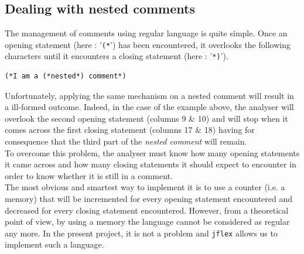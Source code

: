 \documentclass[a4paper,11pt]{article}
\begin{document}
  \subsection{Dealing with nested comments}
    The management of comments using regular language is quite simple. Once an opening statement (here : '\verb|(*|') has been encountered, it overlooks the following characters until it encounters a closing statement (here : '\verb|*)|').
    \begin{lstlisting}
(*I am a (*nested*) comment*)\end{lstlisting}
    Unfortunately, applying the same mechanism on a nested comment will result in a ill-formed outcome. Indeed, in the case of the example above, the analyser will overlook the second opening statement (columns 9 \& 10) and will stop when it comes across the first closing statement (columns 17 \& 18) having for consequence that the third part of the \textit{nested comment} will remain.\\
    To overcome this problem, the analyser must know how many opening statements it came across and how many closing statements it should expect to encounter in order to know whether it is still in a comment.\\
    The most obvious and smartest way to implement it is to use a counter (i.e. a memory) that will be incremented for every opening statement encountered and decreased for every closing statement encountered. However, from a theoretical point of view, by using a memory the language cannot be considered as regular any more. In the present project, it is not a problem and \verb|jflex| allows us to implement such a language.
    
\end{document}
